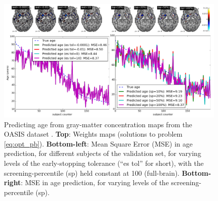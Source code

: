  \begin{figure}[!htb]
   \includegraphics[width=1\linewidth]{figures/screening_weights.png}
  \caption{Predicting age from gray-matter concentration maps from the
    OASIS dataset \citep{marcus2007open}. \textbf{Top}:
    Weights maps (solutions to problem \eqref{eq:opt_pb}).
\textbf{Bottom-left}: Mean Square Error (MSE) in age prediction, for
different subjects of the validation set, for  varying levels of the
early-stopping tolerance (``es tol'' for short), with the
screening-percentile (sp) held constant at 100
(full-brain). \textbf{Bottom-right}: MSE in age prediction, for
varying levels of the screening-percentile (sp).%
}   
\label{fig:oasis}
\end{figure}

